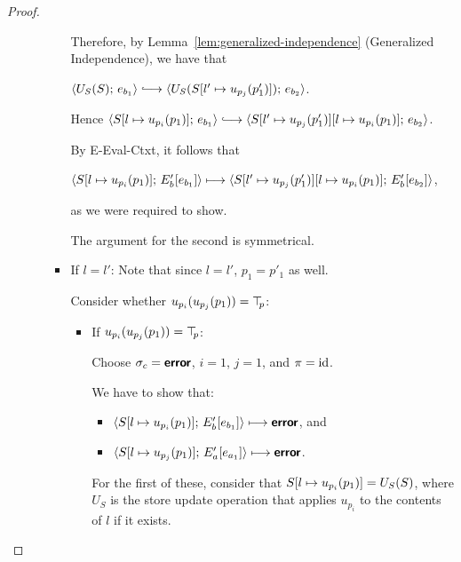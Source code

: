 \begin{proof}
\begin{enumerate}
\begin{enumerate}
\begin{itemize}
        Therefore, by Lemma~\ref{lem:generalized-independence}
        (Generalized Independence), we have that

        $\config{U_S(S)}{e_{b_1}} \parstepsto
        \config{U_S(\extSRaw{S}{l'}{u_{p_j}(p'_1)})}{e_{b_2}}$.

        Hence $\config{\extSRaw{S}{l}{u_{p_i}(p_1)}}{e_{b_1}}
        \parstepsto
        \config{\extSRaw{\extSRaw{S}{l'}{u_{p_j}(p'_1)}}{l}{u_{p_i}(p_1)}}{e_{b_2}}$.

        By {\sc E-Eval-Ctxt}, it follows that

        $\langle S[l \mapsto u_{p_i}(p_1)];\, E'_b\hspace{-0.5mm}\left[e_{b_1}\right] \rangle
        \longmapsto
        \langle S[l' \mapsto u_{p_j}(p'_1)][l \mapsto u_{p_i}(p_1)];\, E'_b\hspace{-0.5mm}\left[e_{b_2}\right] \rangle$,

        as we were required to show.

        The argument for the second is symmetrical.

      \item If $l = l'$:
        Note that since $l = l'$, $p_1 = p'_1$ as well.

        Consider whether $u_{p_i}(u_{p_j}(p_1)) = \top\hspace{-0.85mm}_{p}$:
        \begin{itemize}
        \item If $u_{p_i}(u_{p_j}(p_1)) = \top\hspace{-0.85mm}_{p}$:

          Choose $\sigma_c = \textbf{\textsf{error}}$, $i = 1$, $j = 1$, and $\pi =
          \mathrm{id}$.

          We have to show that:

          \begin{itemize}
          \item
            $\langle S[l \mapsto u_{p_i}(p_1)];\, E'_b\hspace{-0.5mm}\left[e_{b_1}\right] \rangle
            \longmapsto \textbf{\textsf{error}}$, and
          \item
            $\langle S[l \mapsto u_{p_j}(p_1)];\, E'_a\hspace{-0.5mm}\left[e_{a_1}\right] \rangle
            \longmapsto \textbf{\textsf{error}}$.
          \end{itemize}

          For the first of these, consider that
          $S[l \mapsto u_{p_i}(p_1)] = U_S(S)$, where $U_S$ is the
          store update operation that applies $u_{p_i}$ to the
          contents of $l$ if it exists.


\end{itemize}
\end{itemize}
\end{enumerate}
\end{enumerate}
\end{proof}
